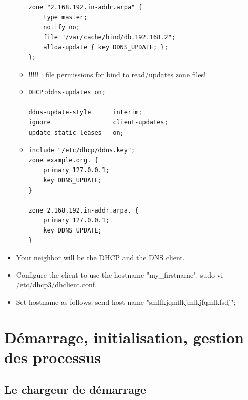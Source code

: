 \documentclass[a4paper]{article}
\begin{document}
\begin{itemize}
\begin{itemize}
\begin{verbatim}
zone "2.168.192.in-addr.arpa" {
    type master;
    notify no;
    file "/var/cache/bind/db.192.168.2";
    allow-update { key DDNS_UPDATE; };
};
    \end{verbatim}
    \item !!!!! : file permissions for bind to read/updates zone files!
    \item \begin{verbatim}
DHCP:ddns-updates on;

ddns-update-style      interim;
ignore                 client-updates;
update-static-leases   on;
    \end{verbatim}
    \item \begin{verbatim}
include "/etc/dhcp/ddns.key";
zone example.org. {
    primary 127.0.0.1;
    key DDNS_UPDATE;
}

zone 2.168.192.in-addr.arpa. {
    primary 127.0.0.1;
    key DDNS_UPDATE;
}
    \end{verbatim}
\end{itemize}

\item Your neighbor will be the DHCP and the DNS client.

\item Configure the client to use the hostname "my\_firstname". sudo vi /etc/dhcp3/dhclient.conf.

\item Set hostname as follows: send host-name "smlfkjqmflkjmlkjfqmlkfsdj";

\end{itemize}















\section{Démarrage, initialisation, gestion des processus}










\subsection{Le chargeur de démarrage}
\end{document}
